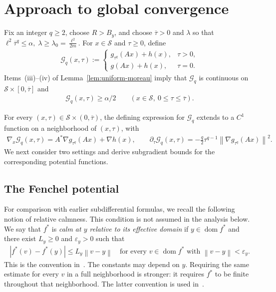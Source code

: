 \documentclass[9pt]{article}
\numberwithin{equation}{section}
\theoremstyle{definition}
\theoremstyle{remark}
\newcommand{\Sset}{\mathcal S}
\newcommand{\norm}[1]{\left\lVert #1\right\rVert}
\newcommand{\Gcal}{\mathcal G}
\DeclareMathOperator{\dom}{dom}
\begin{document}
\section{Approach to global convergence}\label{sec:potential}
Fix an integer $q\geq2$, choose $R>B_y$, and choose $\overline\tau>0$ and
$\lambda$ so that
$
 \ell^2\overline\tau^q\leq\alpha,\;
 \lambda\geq\lambda_0=\frac{\ell^2}{2m}.
$
For $x\in\Sset$ and $\tau\geq0$, define
\begin{eqnarray*}\label{eq:G-lift}
\Gcal_q(x,\tau):=
 \begin{cases}
  g_{\tau^q}(Ax)+h(x),&\tau>0,\\
  g(Ax)+h(x),&\tau=0.
 \end{cases}
\end{eqnarray*}
Items~(iii)--(iv) of Lemma~\ref{lem:uniform-moreau} imply that
$\Gcal_q$ is continuous on $\Sset\times[0,\overline{\tau}]$ and
\begin{eqnarray*}\label{eq:G-positive}
\Gcal_q(x,\tau)\geq\alpha/2
 \qquad(x\in\Sset,\ 0\leq\tau\leq\overline\tau).
\end{eqnarray*}

For every $(x,\tau)\in\Sset\times(0,\overline\tau)$, the defining
expression for $\Gcal_q$ extends to a $C^1$ function on a neighborhood
of $(x,\tau)$, with
\begin{eqnarray}\label{eq:G-derivatives}
\nabla_x\Gcal_q(x,\tau)=A^*\nabla g_{\tau^q}(Ax)+\nabla h(x),
 \qquad
 \partial_\tau\Gcal_q(x,\tau)
 =-\frac q2\tau^{q-1}\norm{\nabla g_{\tau^q}(Ax)}^2.
\end{eqnarray}
We next consider two settings and derive subgradient bounds for the
corresponding potential functions.
\subsection{The Fenchel potential}
For comparison with earlier subdifferential formulas, we recall the
following notion of relative calmness. This condition is not assumed
in the analysis below.
We say that $f^*$ is \emph{calm at $y$ relative to its effective domain}
if $y\in\dom f^*$ and there exist $L_y\geq0$ and $\varepsilon_y>0$
such that
\begin{eqnarray}\label{eq:relative-calmness}
 |f^*(v)-f^*(y)|\leq L_y\norm{v-y}
 \quad\text{for every }v\in\dom f^*
 \text{ with }\norm{v-y}<\varepsilon_y.
\end{eqnarray}
This is the convention in~\cite[Definition~2.1]{LiShenZhangZhou2022}.
The constants may depend on $y$. Requiring the same estimate for
every $v$ in a full neighborhood is stronger: it requires $f^*$
to be finite throughout that neighborhood. The latter convention
is used in~\cite[Definition~2 and Lemma~2]{HTX}.
\end{document}
